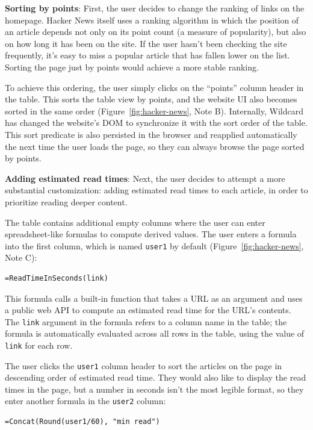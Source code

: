 \documentclass[sigplan,screen,10pt,anonymous,review]{acmart}
\begin{document}
\textbf{Sorting by points}: First, the user decides to change the
ranking of links on the homepage. Hacker News itself uses a ranking
algorithm in which the position of an article depends not only on its
point count (a measure of popularity), but also on how long it has been
on the site. If the user hasn't been checking the site frequently, it's
easy to miss a popular article that has fallen lower on the list.
Sorting the page just by points would achieve a more stable ranking.

To achieve this ordering, the user simply clicks on the ``points''
column header in the table. This sorts the table view by points, and the
website UI also becomes sorted in the same order
(Figure~\ref{fig:hacker-news}, Note B). Internally, Wildcard has changed
the website's DOM to synchronize it with the sort order of the table.
This sort predicate is also persisted in the browser and reapplied
automatically the next time the user loads the page, so they can always
browse the page sorted by points.

\textbf{Adding estimated read times}: Next, the user decides to attempt
a more substantial customization: adding estimated read times to each
article, in order to prioritize reading deeper content.

The table contains additional empty columns where the user can enter
spreadsheet-like formulas to compute derived values. The user enters a
formula into the first column, which is named \texttt{user1} by default
(Figure~\ref{fig:hacker-news}, Note C):

\begin{verbatim}
=ReadTimeInSeconds(link)
\end{verbatim}

This formula calls a built-in function that takes a URL as an argument
and uses a public web API to compute an estimated read time for the
URL's contents. The \texttt{link} argument in the formula refers to a
column name in the table; the formula is automatically evaluated across
all rows in the table, using the value of \texttt{link} for each row.

The user clicks the \texttt{user1} column header to sort the articles on
the page in descending order of estimated read time. They would also
like to display the read times in the page, but a number in seconds
isn't the most legible format, so they enter another formula in the
\texttt{user2} column:

\begin{verbatim}
=Concat(Round(user1/60), "min read")
\end{verbatim}
\end{document}
